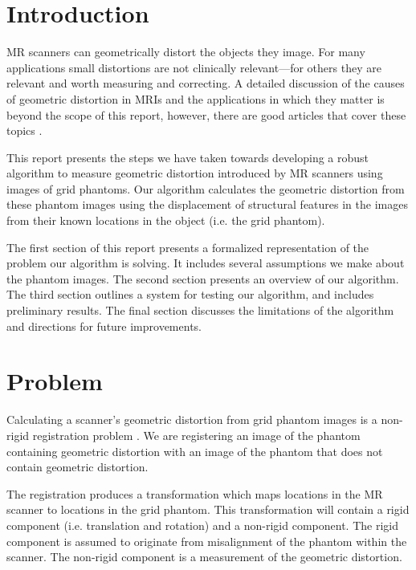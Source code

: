 \documentclass[12pt]{article}
\begin{document}
\maketitle

\section*{Introduction}
MR scanners can geometrically distort the objects they image.  For many applications small distortions are not clinically relevant---for others they are relevant and worth measuring and correcting.  A detailed discussion of the causes of geometric distortion in MRIs and the applications in which they matter is beyond the scope of this report, however, there are good articles that cover these topics \cite{baldwin2007,torfeh2015,wang2005,mribook}.  

This report presents the steps we have taken towards developing a robust algorithm to measure geometric distortion introduced by MR scanners using images of grid phantoms.  Our algorithm calculates the geometric distortion from these phantom images using the displacement of structural features in the images from their known locations in the object (i.e. the grid phantom).

The first section of this report presents a formalized representation of the problem our algorithm is solving.  It includes several assumptions we make about the phantom images.  The second section presents an overview of our algorithm.  The third section outlines a system for testing our algorithm, and includes preliminary results.  The final section discusses the limitations of the algorithm and directions for future improvements.

\section*{Problem}
Calculating a scanner's geometric distortion from grid phantom images is a non-rigid registration problem \cite{hill2001}.  We are registering an image of the phantom containing geometric distortion with an image of the phantom that does not contain geometric distortion.

The registration produces a transformation which maps locations in the MR scanner to locations in the grid phantom.  This transformation will contain a rigid component (i.e. translation and rotation) and a non-rigid component.  The rigid component is assumed to originate from misalignment of the phantom within the scanner.  The non-rigid component is a measurement of the geometric distortion.
\end{document}
